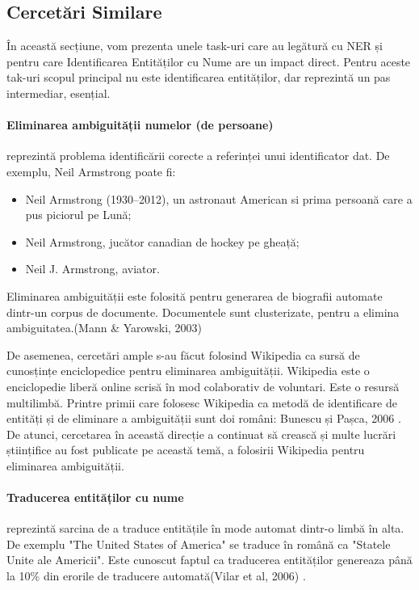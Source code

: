 \subsection{Cercetări Similare}

În această secțiune, vom prezenta unele task-uri care au legătură cu NER și pentru care Identificarea Entităților cu Nume are un impact direct. Pentru aceste tak-uri scopul principal nu este identificarea entităților, dar reprezintă un pas intermediar, esențial.

\paragraph{Eliminarea ambiguității numelor (de persoane)}

reprezintă problema identificării corecte a referinței unui identificator dat. De exemplu, Neil Armstrong poate fi:

\begin{itemize}
\item Neil Armstrong (1930–2012), un astronaut American si prima persoană care a pus piciorul pe Lună;
\item Neil Armstrong, jucător canadian de hockey pe gheață;
\item Neil J. Armstrong, aviator.
\end{itemize}

Eliminarea ambiguității este folosită pentru generarea de biografii automate dintr-un corpus de documente. Documentele sunt clusterizate, pentru a elimina ambiguitatea.(Mann \& Yarowski, 2003)\cite{Mann03unsupervisedpersonal}

De asemenea, cercetări ample s-au făcut folosind Wikipedia ca sursă de cunosțințe enciclopedice pentru eliminarea ambiguității. Wikipedia este o enciclopedie liberă online scrisă în mod colaborativ de voluntari. Este o resursă multilimbă. Printre primii care folosesc Wikipedia ca metodă de identificare de entități și de eliminare a ambiguității sunt doi români: Bunescu și Pașca, 2006 \cite{Bunescu06usingencyclopedic}. De atunci, cercetarea în această direcție a continuat să crească și multe lucrări științifice au fost publicate pe această temă, a folosirii Wikipedia pentru eliminarea ambiguității.

\paragraph{Traducerea entităților cu nume}

reprezintă sarcina de a traduce entitățile în mode automat dintr-o limbă în alta. De exemplu "The United States of America" se traduce în română ca "Statele Unite ale Americii". Este cunoscut faptul ca traducerea entităților genereaza până la 10\% din erorile de traducere automată(Vilar et al, 2006) \cite{vilar2006}.

